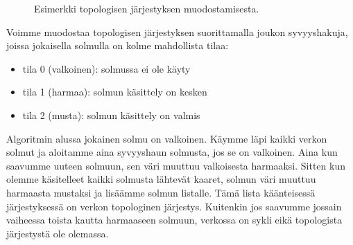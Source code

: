 \begin{figure}
\begin{center}
\end{center}
\caption{Esimerkki topologisen järjestyksen muodostamisesta.}
\label{fig:topesi}
\end{figure}

Voimme muodostaa topologisen järjestyksen suorittamalla
joukon syvyyshakuja, joissa jokaisella solmulla on kolme mahdollista tilaa:

\begin{itemize}
\item tila 0 (valkoinen): solmussa ei ole käyty
\item tila 1 (harmaa): solmun käsittely on kesken
\item tila 2 (musta): solmun käsittely on valmis
\end{itemize}

Algoritmin alussa jokainen solmu on valkoinen.
Käymme läpi kaikki verkon solmut ja aloitamme aina syvyyshaun
solmusta, jos se on valkoinen.
Aina kun saavumme uuteen solmuun, sen väri muuttuu
valkoisesta harmaaksi.
Sitten kun olemme käsitelleet kaikki solmusta lähtevät
kaaret, solmun väri muuttuu harmaasta mustaksi
ja lisäämme solmun listalle.
Tämä lista käänteisessä järjestyksessä on verkon
topologinen järjestys.
Kuitenkin jos saavumme jossain vaiheessa
toista kautta harmaaseen solmuun,
verkossa on sykli eikä topologista järjestystä ole olemassa.

